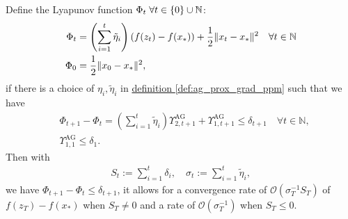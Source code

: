 \documentclass[12pt]{article}
\begin{document}
    \begin{theorem}
    \label{thm:generic_ag_convergence}
        Define the Lyapunov function $\Phi_t\; \forall t \in \{0\}\cup \mathbb N$: 
        \begin{align*}
            \Phi_t &= \left(
                \sum_{i = 1}^{t} \tilde\eta_{i}
            \right) (f(z_t) - f(x_*)) + \frac{1}{2}\Vert x_t - x_*\Vert^2 \quad \forall t \in \mathbb N
            \\
            \Phi_0 &= \frac{1}{2}\Vert x_0 - x_*\Vert^2, 
        \end{align*}
        if there is a choice of $\eta_i, \tilde \eta_i$ in 
        \hyperref[def:ag_prox_grad_ppm]{definition \ref*{def:ag_prox_grad_ppm}} such that we have 
        \begin{align*}
            & \Phi_{t + 1} - \Phi_{t} =
            \left(
                \sum_{i = 1}^{t} \tilde \eta_i
            \right)\Upsilon_{2, t + 1}^{\text{AG}} + 
            \Upsilon_{1, t + 1}^{\text{AG}} 
            \le \delta_{t + 1} \quad 
            \forall t \in \mathbb N, 
            \\
            & \Upsilon_{1, 1}^{\text{AG}} \le \delta_1. 
        \end{align*}
        Then with
        \begin{align*}
            S_t := \sum_{i = 1}^{t} \delta_i,
            \quad 
            \sigma_t := \sum_{i = 1}^{t}\tilde \eta_i, 
        \end{align*}
        we have $\Phi_{t + 1} - \Phi_t \le \delta_{t + 1}$, it allows for a convergence rate of $\mathcal O \left(\sigma_T^{-1}S_T\right)$ of $f(z_T) - f(x_*)$ when $S_T \neq 0$ and a rate of $\mathcal O(\sigma_T^{-1})$ when $S_T \le 0$. 
    \end{theorem}
\end{document}
